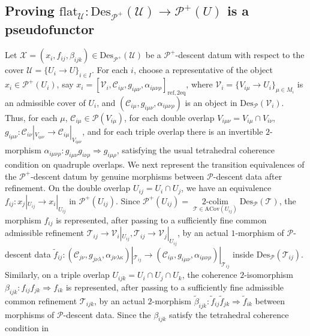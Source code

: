 \documentclass[reqno]{amsart}
\theoremstyle{definition}
\theoremstyle{remark}
\begin{document}
\subsection{Proving $\text{flat}_{\mathcal{U}}: \text{Des}_{\mathscr{P}^+}(\mathcal{U}) \longrightarrow \mathscr{P}^+(U) $ is a pseudofunctor}
Let $\mathcal X=(x_i,f_{ij},\beta_{ijk})
\in \text{Des}_{\mathscr P^+}(\mathcal U)$ be a $\mathscr P^+$-descent datum with respect to the cover $\mathcal U=\{U_i\to U\}_{i\in I}$. For each $i$, choose a representative of the object $x_i\in \mathscr P^+(U_i)$, say $x_i=\left[
\mathcal V_i,\mathcal C_{i\mu},g_{i\mu\nu}, \alpha_{i\mu\nu\rho}
\right]_{\mathrm{ref},2\mathrm{eq}}$, where $\mathcal V_i=\{V_{i\mu}\to U_i\}_{\mu\in M_i}$ is an admissible cover of $U_i$, and $(\mathcal C_{i\mu},g_{i\mu\nu},\alpha_{i\mu\nu\rho})$ is an object in $\text{Des}_{\mathscr P}(\mathcal V_i)$. Thus, for each $\mu$, $\mathcal C_{i\mu}\in \mathscr P(V_{i\mu})$, for each double overlap $V_{i\mu\nu}=V_{i\mu}\cap V_{i\nu}$, $g_{i\mu\nu}:\mathcal C_{i\nu}|_{V_{i\mu\nu}}\longrightarrow\mathcal C_{i\mu}|_{V_{i\mu\nu}}$, and for each triple overlap there is an invertible $2$-morphism $\alpha_{i\mu\nu\rho}:g_{i\mu\nu}g_{i\nu\rho}\Longrightarrow g_{i\mu\rho}$, satisfying the usual tetrahedral coherence condition on quadruple overlaps. We next represent the transition equivalences of the $\mathscr P^+$-descent datum by genuine morphisms between $\mathscr P$-descent data after refinement. On the double overlap $U_{ij}=U_i\cap U_j$, we have an equivalence $f_{ij}:x_j|_{U_{ij}}\longrightarrow x_i|_{U_{ij}}$ in $\mathscr P^+(U_{ij})$. Since $\mathscr P^+(U_{ij})=\mathop{2\text{-colim}}\limits_{\mathcal T\in\text{ACov}(U_{ij})}\text{Des}_{\mathscr P}(\mathcal T)$, the morphism $f_{ij}$ is represented, after passing to a sufficiently fine common admissible refinement $\mathcal T_{ij}\to \mathcal V_i|_{U_{ij}},\mathcal T_{ij}\to \mathcal V_j|_{U_{ij}}$, by an actual $1$-morphism of $\mathscr P$-descent data $\widetilde f_{ij}:(\mathcal C_{j\nu},g_{j\nu\lambda},\alpha_{j\nu\lambda\kappa})|_{\mathcal T_{ij}}\longrightarrow (\mathcal C_{i\mu},g_{i\mu\nu},\alpha_{i\mu\nu\rho})
|_{\mathcal T_{ij}}$ inside $\text{Des}_{\mathscr P}(\mathcal T_{ij})$. Similarly, on a triple overlap $U_{ijk}=U_i\cap U_j\cap U_k$, the coherence $2$-isomorphism $\beta_{ijk}:f_{ij}f_{jk}\Longrightarrow f_{ik}$ is represented, after passing to a sufficiently fine admissible common refinement $\mathcal T_{ijk}$, by an actual $2$-morphism $\widetilde\beta_{ijk}: \widetilde f_{ij}\widetilde f_{jk} \Longrightarrow \widetilde f_{ik} $ between morphisms of $\mathscr P$-descent data. Since the $\beta_{ijk}$ satisfy the tetrahedral coherence condition in
\end{document}
